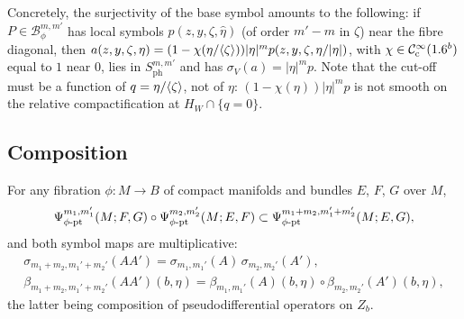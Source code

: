 Concretely, the surjectivity of the base symbol amounts to the following: if
$P\in\mathcal B^{m,m'}_\phi$ has local symbols $p(z,y,\zeta,\hat\eta)$ (of order $m'-m$
in $\zeta$) near the fibre diagonal, then
$a(z,y,\zeta,\eta)=(1-\chi(\eta/\langle \zeta\rangle))|\eta|^mp(z,y,\zeta,\eta/|\eta|)$, with
$\chi\in\mathcal{C}^\infty_{\mathrm{c}}(1.6^b)$ equal to $1$ near $0$, lies in $S^{m,m'}_{\mathrm{ph}}$ and has
$\sigma_V(a)=|\eta|^mp$. Note that the cut-off must be a function of
$q=\eta/\langle \zeta\rangle$, not of $\eta$: $(1-\chi(\eta))|\eta|^mp$ is not smooth on the
relative compactification at $H_W\cap\{q=0\}$.

\subsection{Composition}

\begin{theorem}\label{product:thm:composition}
For any fibration $\phi:M\longrightarrow B$ of compact manifolds and bundles $E$,
$F$, $G$ over $M$,
\begin{equation*}
\Psi^{m_1,m_1'}_{\phi\text{-}\mathrm{pt}}(M;F,G)\circ\Psi^{m_2,m_2'}_{\phi\text{-}\mathrm{pt}}(M;E,F)\subset
\Psi^{m_1+m_2,m_1'+m_2'}_{\phi\text{-}\mathrm{pt}}(M;E,G),
\end{equation*}
and both symbol maps are multiplicative:
\begin{gather*}
\sigma_{m_1+m_2,m_1'+m_2'}(AA')=\sigma_{m_1,m_1'}(A)\,\sigma_{m_2,m_2'}(A'),\\
\beta_{m_1+m_2,m_1'+m_2'}(AA')(b,\eta)=\beta_{m_1,m_1'}(A)(b,\eta)\circ
\beta_{m_2,m_2'}(A')(b,\eta),
\end{gather*}
the latter being composition of pseudodifferential operators on $Z_b$.
\end{theorem}

